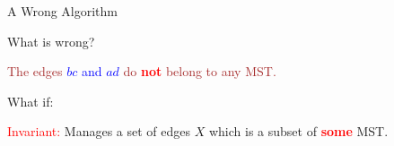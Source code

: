 \begin{frame}{A Wrong Algorithm}
  \begin{alertblock}{What is wrong?}

	\centerline{\textcolor{brown}{The edges \textcolor{blue}{$bc$ and $ad$} do \textcolor{red}{\bf not} belong to any MST.}}
  \end{alertblock}

  \pause
  \vspace{0.50cm}

  \begin{alertblock}{What if:}
	\centerline{\textcolor{red}{Invariant:} Manages a set of edges $X$ which is a subset of \textcolor{red}{\bf some} MST.}
  \end{alertblock}
\end{frame}
